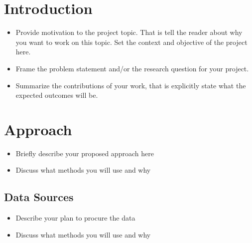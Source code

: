\documentclass[sigconf]{acmart}
\begin{document}
\section{Introduction}
\begin{itemize}
    \item Provide motivation to the project topic. That is tell the reader about why you want to work on this topic. Set the context and objective of the project here. 
    \item Frame the problem statement and/or the research question for your project.
    \item Summarize the contributions of your work, that is explicitly state what the expected outcomes will be. 
\end{itemize}
	


\section{Approach}
\begin{itemize}
    \item Briefly describe your proposed approach here
    \item Discuss what methods you will use and why
\end{itemize}


\subsection{Data Sources}
\begin{itemize}
    \item Describe your plan to procure the data
    \item Discuss what methods you will use and why
\end{itemize}

\end{document}
